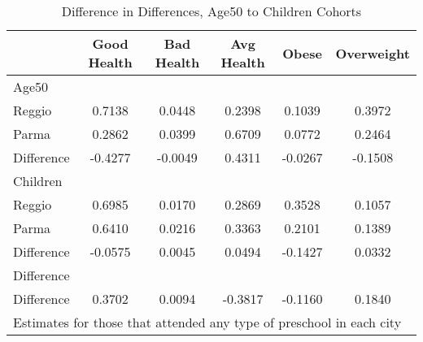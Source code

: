 \begin{table}[htbp]\centering
\caption{Difference in Differences, Age50 to Children Cohorts}
\begin{tabular}{l*{5}{c}}
\hline\hline
            & Good Health&  Bad Health&  Avg Health&       Obese&  Overweight\\
\hline
Age50       &            &            &            &            &            \\
Reggio      &      0.7138&      0.0448&      0.2398&      0.1039&      0.3972\\
Parma       &      0.2862&      0.0399&      0.6709&      0.0772&      0.2464\\
Difference  &     -0.4277&     -0.0049&      0.4311&     -0.0267&     -0.1508\\
\hline
Children    &            &            &            &            &            \\
Reggio      &      0.6985&      0.0170&      0.2869&      0.3528&      0.1057\\
Parma       &      0.6410&      0.0216&      0.3363&      0.2101&      0.1389\\
Difference  &     -0.0575&      0.0045&      0.0494&     -0.1427&      0.0332\\
\hline
Difference  &            &            &            &            &            \\
Difference  &      0.3702&      0.0094&     -0.3817&     -0.1160&      0.1840\\
\hline\hline
\multicolumn{6}{l}{\footnotesize Estimates for those that attended any type of preschool in each city}\\
\end{tabular}
\end{table}
